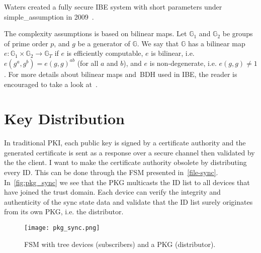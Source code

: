 Waters created a fully secure \gls{IBE} system with short parameters under \gls{simple_assumption} in 2009~\cite{DBLP:conf/crypto/Waters09}.

The complexity assumptions is based on bilinear maps.
Let $\mathbb{G}_1$ and $\mathbb{G}_2$ be groups of prime order $p$, and $g$ be a generator of $\mathbb{G}$. 
We say that $\mathbb{G}$ has a bilinear map $e : \mathbb{G}_1 \times \mathbb{G}_2 \to \mathbb{G}_T$ if $e$ is efficiently computable, $e$ is bilinear, i.e. $e(g^a, g^b) = e(g, g)^{ab}$ (for all $a$ and $b$), and $e$ is non-degenerate, i.e. $e(g,g)\neq 1$.
For more details about bilinear maps and~\gls{BDH} used in \gls{IBE}, the reader is encouraged to take a look at~\cite{DBLP:conf/crypto/BonehF01,DBLP:journals/iacr/Naccache05}.

\section{Key Distribution}\label{key-distribution}
In traditional \gls{PKI}, each public key is signed by a certificate authority and the generated certificate is sent as a response over a secure channel then validated by the the client.
I want to make the certificate authority obsolete by distributing every \gls{ID}.
This can be done through the \gls{FSM} presented in~\autoref{file-sync}.
In~\autoref{fig:pkg_sync} we see that the \gls{PKG} multicasts the \gls{ID} list to all devices that have joined the trust domain.
Each device can verify the integrity and authenticity of the sync state \gls{data} and validate that the \gls{ID} list surely originates from its own \gls{PKG}, i.e. the distributor.
\begin{figure}[ht]
  \centering
  \texttt{[image: pkg\_sync.png]}
  \caption{FSM with tree devices (subscribers) and a PKG (distributor).}
  \label{fig:pkg_sync}
\end{figure}


